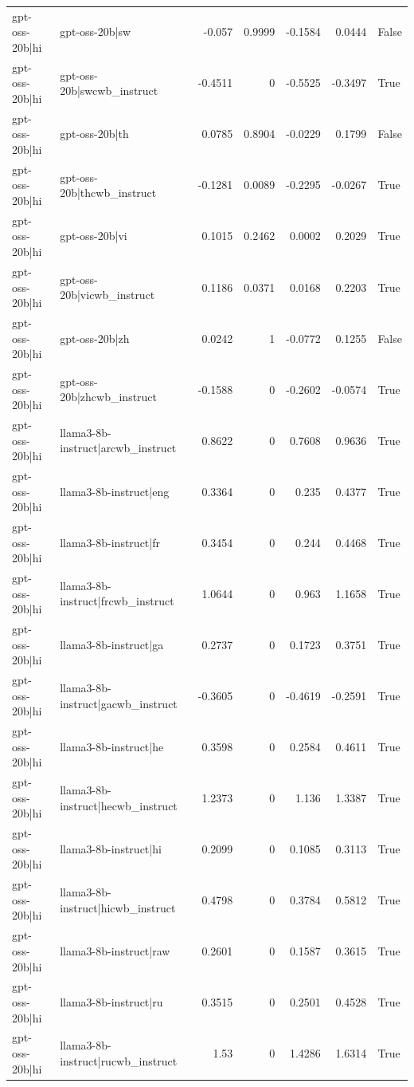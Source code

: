 \begin{table}
\begin{tabular}{l l r r r r l}
gpt-oss-20b|hi & gpt-oss-20b|sw & -0.057 & 0.9999 & -0.1584 & 0.0444 & False \\
gpt-oss-20b|hi & gpt-oss-20b|swcwb_instruct & -0.4511 & 0 & -0.5525 & -0.3497 & True \\
gpt-oss-20b|hi & gpt-oss-20b|th & 0.0785 & 0.8904 & -0.0229 & 0.1799 & False \\
gpt-oss-20b|hi & gpt-oss-20b|thcwb_instruct & -0.1281 & 0.0089 & -0.2295 & -0.0267 & True \\
gpt-oss-20b|hi & gpt-oss-20b|vi & 0.1015 & 0.2462 & 0.0002 & 0.2029 & True \\
gpt-oss-20b|hi & gpt-oss-20b|vicwb_instruct & 0.1186 & 0.0371 & 0.0168 & 0.2203 & True \\
gpt-oss-20b|hi & gpt-oss-20b|zh & 0.0242 & 1 & -0.0772 & 0.1255 & False \\
gpt-oss-20b|hi & gpt-oss-20b|zhcwb_instruct & -0.1588 & 0 & -0.2602 & -0.0574 & True \\
gpt-oss-20b|hi & llama3-8b-instruct|arcwb_instruct & 0.8622 & 0 & 0.7608 & 0.9636 & True \\
gpt-oss-20b|hi & llama3-8b-instruct|eng & 0.3364 & 0 & 0.235 & 0.4377 & True \\
gpt-oss-20b|hi & llama3-8b-instruct|fr & 0.3454 & 0 & 0.244 & 0.4468 & True \\
gpt-oss-20b|hi & llama3-8b-instruct|frcwb_instruct & 1.0644 & 0 & 0.963 & 1.1658 & True \\
gpt-oss-20b|hi & llama3-8b-instruct|ga & 0.2737 & 0 & 0.1723 & 0.3751 & True \\
gpt-oss-20b|hi & llama3-8b-instruct|gacwb_instruct & -0.3605 & 0 & -0.4619 & -0.2591 & True \\
gpt-oss-20b|hi & llama3-8b-instruct|he & 0.3598 & 0 & 0.2584 & 0.4611 & True \\
gpt-oss-20b|hi & llama3-8b-instruct|hecwb_instruct & 1.2373 & 0 & 1.136 & 1.3387 & True \\
gpt-oss-20b|hi & llama3-8b-instruct|hi & 0.2099 & 0 & 0.1085 & 0.3113 & True \\
gpt-oss-20b|hi & llama3-8b-instruct|hicwb_instruct & 0.4798 & 0 & 0.3784 & 0.5812 & True \\
gpt-oss-20b|hi & llama3-8b-instruct|raw & 0.2601 & 0 & 0.1587 & 0.3615 & True \\
gpt-oss-20b|hi & llama3-8b-instruct|ru & 0.3515 & 0 & 0.2501 & 0.4528 & True \\
gpt-oss-20b|hi & llama3-8b-instruct|rucwb_instruct & 1.53 & 0 & 1.4286 & 1.6314 & True \\

\end{tabular}
\end{table}
